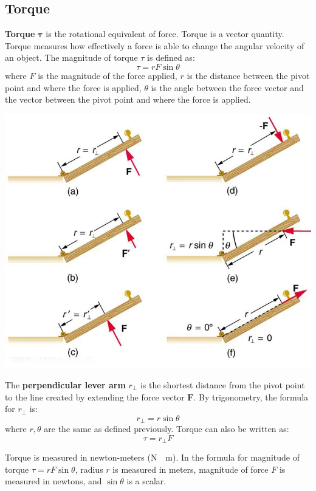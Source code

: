 \documentclass{article}
\newcommand{\definition}[1]{\begin{tcolorbox}[colback=red!5!white,colframe=red!75!black,parbox=false] #1 \end{tcolorbox}}
\begin{document}
\subsection{Torque}

\definition{\textbf{Torque} $\boldsymbol{\tau}$ is the rotational equivalent of force. Torque is a vector quantity. Torque measures how effectively a force is able to change the angular velocity of an object. The magnitude of torque $\tau$ is defined as:
\begin{equation*}
	\tau=rF\sin\theta
\end{equation*}
where $F$ is the magnitude of the force applied, $r$ is the distance between the pivot point and where the force is applied, $\theta$ is the angle between the force vector and the vector between the pivot point and where the force is applied.}
\begin{center}
	\includegraphics[width=0.8\linewidth]{torque.png}
\end{center}
\definition{The \textbf{perpendicular lever arm} $r_\perp$ is the shortest distance from the pivot point to the line created by extending the force vector $\mathbf{F}$. By trigonometry, the formula for $r_\perp$ is:
\begin{equation*}
    r_\perp=r\sin\theta
\end{equation*}
where $r,\theta$ are the same as defined previously. Torque can also be written as:
\begin{equation*}
    \tau=r_\perp F
\end{equation*}}
Torque is measured in newton-meters (\si{\newton\cdot\meter}). In the formula for magnitude of torque $\tau=rF\sin\theta$, radius $r$ is measured in meters, magnitude of force $F$ is measured in newtons, and $\sin\theta$ is a scalar.
\end{document}
